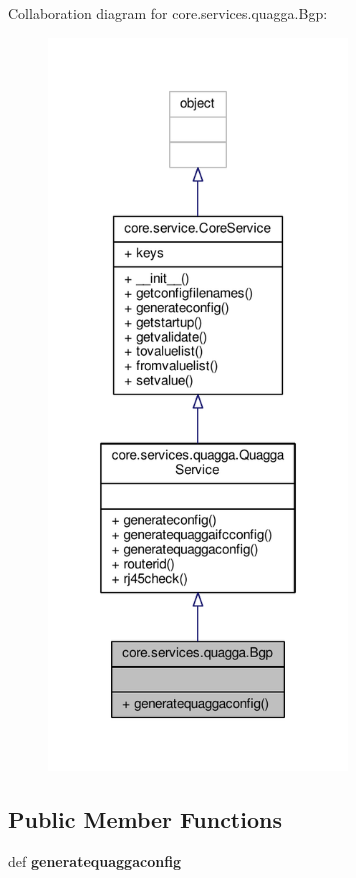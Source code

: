 Collaboration diagram for core.\+services.\+quagga.\+Bgp\+:
\nopagebreak
\begin{figure}[H]
\begin{center}
\leavevmode
\includegraphics[height=550pt]{classcore_1_1services_1_1quagga_1_1_bgp__coll__graph}
\end{center}
\end{figure}
\subsection*{Public Member Functions}
\begin{DoxyCompactItemize}
\item 
\hypertarget{classcore_1_1services_1_1quagga_1_1_bgp_a2fe5e5d413ecf06a90dfc7bacca76af2}{def {\bfseries generatequaggaconfig}}\label{classcore_1_1services_1_1quagga_1_1_bgp_a2fe5e5d413ecf06a90dfc7bacca76af2}

\end{DoxyCompactItemize}
